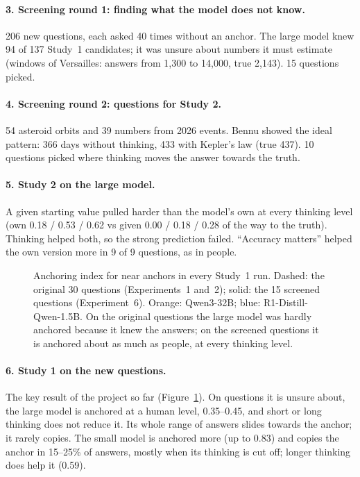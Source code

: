 \documentclass[11pt,a4paper]{article}
\begin{document}
\paragraph{3. Screening round 1: finding what the model does not know.} 206 new questions, each asked 40 times without an anchor. The large model knew 94 of 137 Study~1 candidates; it was unsure about numbers it must estimate (windows of Versailles: answers from 1,300 to 14,000, true 2,143). 15 questions picked.

\paragraph{4. Screening round 2: questions for Study 2.} 54 asteroid orbits and 39 numbers from 2026 events. Bennu showed the ideal pattern: 366 days without thinking, 433 with Kepler's law (true 437). 10 questions picked where thinking moves the answer towards the truth.

\paragraph{5. Study 2 on the large model.} A given starting value pulled harder than the model's own at every thinking level (own 0.18 / 0.53 / 0.62 vs given 0.00 / 0.18 / 0.28 of the way to the truth). Thinking helped both, so the strong prediction failed. \enquote{Accuracy matters} helped the own version more in 9 of 9 questions, as in people.

\begin{figure}[ht]
\centering{}
\caption{Anchoring index for near anchors in every Study~1 run. Dashed: the original 30 questions (Experiments~1 and~2); solid: the 15 screened questions (Experiment~6). Orange: Qwen3-32B; blue: R1-Distill-Qwen-1.5B. On the original questions the large model was hardly anchored because it knew the answers; on the screened questions it is anchored about as much as people, at every thinking level.}
\label{fig:index}
\end{figure}

\paragraph{6. Study 1 on the new questions.} The key result of the project so far (Figure~\ref{fig:index}). On questions it is unsure about, the large model is anchored at a human level, 0.35--0.45, and short or long thinking does not reduce it. Its whole range of answers slides towards the anchor; it rarely copies. The small model is anchored more (up to 0.83) and copies the anchor in 15--25\% of answers, mostly when its thinking is cut off; longer thinking does help it (0.59).
\end{document}
